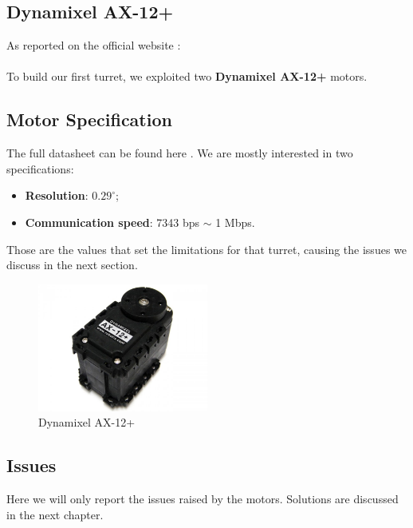 \subsection{Dynamixel AX-12+}
As reported on the official website \cite{web-AX-12}:\\ \\
To build our first turret, we exploited two \textbf{Dynamixel AX-12+} motors.
\subsection{Motor Specification}
The full datasheet can be found here \cite{datasheet-AX-12}. We are mostly interested in two specifications: 
\begin{itemize}
    \item \textbf{Resolution}: $0.29^{\circ}$;
    \item \textbf{Communication speed}: 7343 bps $\sim$ 1 Mbps.
\end{itemize}
Those are the values that set the limitations for that turret, causing the issues we discuss in the next section.
\begin{figure}
	\centering
	\includegraphics[width=0.5\textwidth]{img/ax12+.jpg}%
	\caption{Dynamixel AX-12+}
	\label{fig:ax12+}
\end{figure}
\subsection{Issues}\label{subs:firstModel:issues}
Here we will only report the issues raised by the motors. Solutions are discussed in the next chapter.
